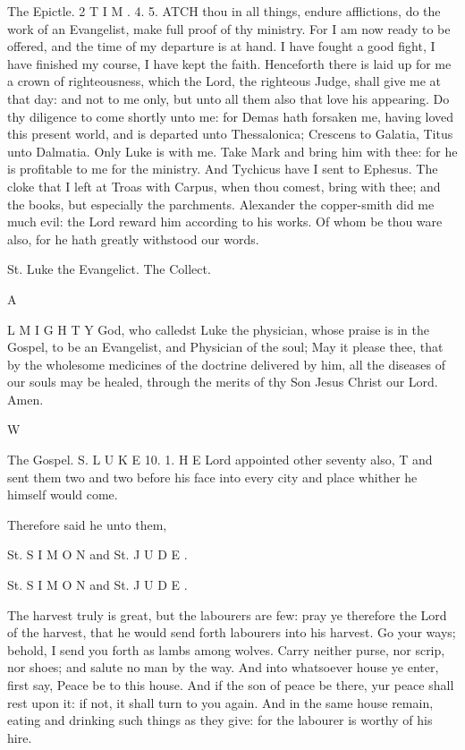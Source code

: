 The Epictle. 2 T I M . 4. 5. ATCH thou in all things, endure afflictions, do the work of an Evangelist, make full proof of thy ministry. For I am now ready to be offered, and the time of my departure is at hand. I have fought a good fight, I have finished my course, I have kept the faith. Henceforth there is laid up for me a crown of righteousness, which the Lord, the righteous Judge, shall give me at that day: and not to me only, but unto all them also that love his appearing. Do thy diligence to come shortly unto me: for Demas hath forsaken me, having loved this present world, and is departed unto Thessalonica; Crescens to Galatia, Titus unto Dalmatia. Only Luke is with me. Take Mark and bring him with thee: for he is profitable to me for the ministry. And Tychicus have I sent to Ephesus. The cloke that I left at Troas with Carpus, when thou comest, bring with thee; and the books, but especially the parchments. Alexander the copper-smith did me much evil: the Lord reward him according to his works. Of whom be thou ware also, for he hath greatly withstood our words.

St. Luke the Evangelict. The Collect.

A

L M I G H T Y God, who calledst Luke the physician, whose praise is in the Gospel, to be an Evangelist, and Physician of the soul; May it please thee, that by the wholesome medicines of the doctrine delivered by him, all the diseases of our souls may be healed, through the merits of thy Son Jesus Christ our Lord. Amen.

W

The Gospel. S. L U K E 10. 1. H E Lord appointed other seventy also, T and sent them two and two before his face into every city and place whither he himself would come.

Therefore said he unto them,

St. S I M O N and St. J U D E .

St. S I M O N and St. J U D E .

The harvest truly is great, but the labourers are few: pray ye therefore the Lord of the harvest, that he would send forth labourers into his harvest. Go your ways; behold, I send you forth as lambs among wolves. Carry neither purse, nor scrip, nor shoes; and salute no man by the way. And into whatsoever house ye enter, first say, Peace be to this house. And if the son of peace be there, yur peace shall rest upon it: if not, it shall turn to you again. And in the same house remain, eating and drinking such things as they give: for the labourer is worthy of his hire.

